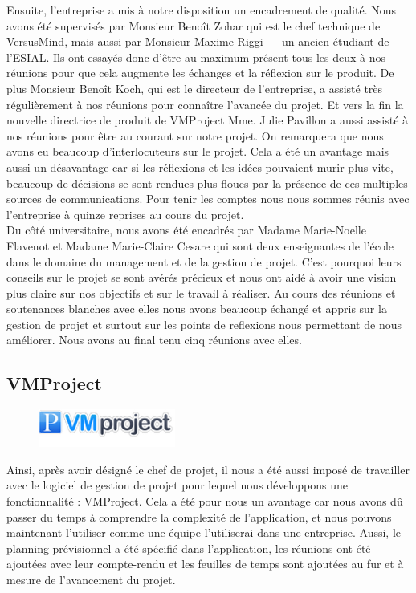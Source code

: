 \documentclass[12pt]{report}
\begin{document}

Ensuite, l’entreprise a mis à notre disposition un encadrement de qualité. Nous avons été supervisés par Monsieur Benoît Zohar qui est le chef technique de VersusMind, mais aussi par Monsieur Maxime Riggi — un ancien étudiant de l’ESIAL. Ils ont essayés donc d’être au maximum présent tous les deux à nos réunions pour que cela augmente les échanges et la réflexion sur le produit. De plus Monsieur Benoît Koch, qui est le directeur de l’entreprise, a assisté très régulièrement à nos réunions pour connaître l’avancée du projet. Et vers la fin la nouvelle directrice de produit de VMProject Mme. Julie Pavillon a aussi assisté à nos réunions pour être au courant sur notre projet. On remarquera que nous avons eu beaucoup d'interlocuteurs sur le projet. Cela a été un avantage mais aussi un désavantage car si les réflexions et les idées pouvaient murir plus vite, beaucoup de décisions se sont rendues plus floues par la présence de ces multiples sources de communications. Pour tenir les comptes nous nous sommes réunis avec l’entreprise à quinze reprises au cours du projet.\\

Du côté universitaire, nous avons été encadrés par Madame Marie-Noelle Flavenot et Madame Marie-Claire Cesare qui sont deux enseignantes de l’école dans le domaine du management et de la gestion de projet. C’est pourquoi leurs conseils sur le projet se sont avérés précieux et nous ont aidé à avoir une vision plus claire sur nos objectifs et sur le travail à réaliser. Au cours des réunions et soutenances blanches avec elles nous avons beaucoup échangé et appris sur la gestion de projet et surtout sur les points de reflexions nous permettant de nous améliorer. Nous avons au final tenu cinq réunions avec elles.\\

		
		\subsection{VMProject}
		
		\begin{figure}[!h]
	\centering
	\includegraphics[width=0.4\textwidth]{pictures/vmplogo.png}
\end{figure}
		
		
Ainsi, après avoir désigné le chef de projet, il nous a été aussi imposé de travailler avec le logiciel de gestion de projet pour lequel nous développons une fonctionnalité : VMProject. Cela a été pour nous un avantage car nous avons dû passer du temps à comprendre la complexité de l’application, et nous pouvons maintenant l’utiliser comme une équipe l’utiliserai dans une entreprise. Aussi, le planning prévisionnel a été spécifié dans l’application, les réunions ont été ajoutées avec leur compte-rendu et les feuilles de temps sont ajoutées au fur et à mesure de l’avancement du projet.\\
\end{document}
